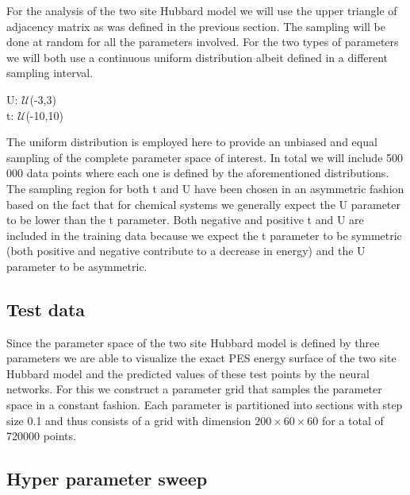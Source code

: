 \documentclass[12pt]{article}
\begin{document}
For the analysis of the two site Hubbard model we will use the upper triangle of adjacency matrix as was defined in the previous section. The sampling will be done at random for all the parameters involved. For the two types of parameters we will both use a continuous uniform distribution albeit defined in a different sampling interval.
\begin{center}
	U: $\mathcal{U}$(-3,3) \\
	t: $\mathcal{U}$(-10,10)\\
\end{center}
The uniform distribution is employed here to provide an unbiased and equal sampling of the complete parameter space of interest. In total we will include 500 000 data points where each one is defined by the aforementioned distributions. The sampling region for both t and U have been chosen in an asymmetric fashion based on the fact that for chemical systems we generally expect the U parameter to be lower than the t parameter. Both negative and positive t and U are included in the training data because we expect the t parameter to be symmetric (both positive and negative contribute to a decrease in energy) and the U parameter to be asymmetric. 

\subsection{Test data}

Since the parameter space of the two site Hubbard model is defined by three parameters we are able to visualize the exact PES energy surface of the two site Hubbard model and the predicted values of these test points by the neural networks. For this we construct a parameter grid that samples the parameter space in a constant fashion. Each parameter is partitioned into sections with step size 0.1 and thus consists of a grid with dimension $200\times60\times60$ for a total of 720000 points. 

\subsection{Hyper parameter sweep}
\end{document}
